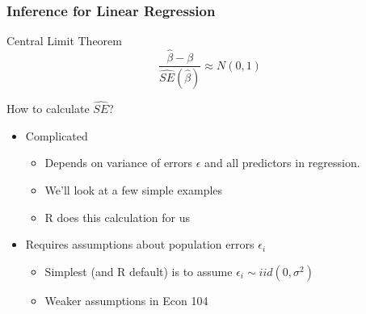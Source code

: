 \documentclass[handout]{beamer}
\begin{document}











\begin{frame}
\frametitle{Inference for Linear Regression}
	\begin{block}{Central Limit Theorem}
		$$\frac{\widehat{\beta} - \beta}{\widehat{SE}(\widehat{\beta})} \approx N(0,1)$$ 
\end{block}

\begin{block}{How to calculate $\widehat{SE}$?}
	\begin{itemize}
\item Complicated 
	\begin{itemize}
\item Depends on variance of errors $\epsilon$ and all predictors in regression. 
\item We'll look at a few simple examples 
\item R does this calculation for us 
\end{itemize}
\item Requires assumptions about population errors $\epsilon_i$ 
	\begin{itemize}
\item Simplest (and R default) is to assume $\epsilon_i \sim iid (0,\sigma^2)$ 
\item Weaker assumptions in Econ 104 
\end{itemize}

\end{itemize}
\end{block}

\end{frame}
\end{document}
